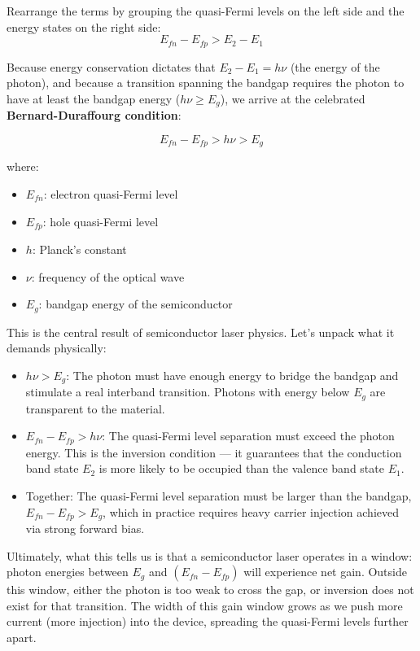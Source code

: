 Rearrange the terms by grouping the quasi-Fermi levels on the left side and the energy states on the right side:
\begin{equation*}
    E_{fn} - E_{fp} > E_2 - E_1
\end{equation*}

Because energy conservation dictates that $E_2 - E_1 = h\nu$ (the energy of the photon), and because a transition spanning the bandgap requires the photon to have at least the bandgap energy ($h\nu \geq E_g$), we arrive at the celebrated \textbf{Bernard-Duraffourg condition}:
\begin{keyresult}
    \begin{equation}
        E_{fn} - E_{fp} > h\nu > E_g
    \end{equation}
\end{keyresult}
where:
\begin{itemize}
    \item $E_{fn}$: electron quasi-Fermi level
    \item $E_{fp}$: hole quasi-Fermi level
    \item $h$: Planck's constant
    \item $\nu$: frequency of the optical wave
    \item $E_g$: bandgap energy of the semiconductor
\end{itemize}

This is the central result of semiconductor laser physics. Let's unpack what it demands physically:

\begin{itemize}
    \item $h\nu > E_g$: The photon must have enough energy to bridge the bandgap and stimulate a real interband transition. Photons with energy below $E_g$ are transparent to the material.
    \item $E_{fn} - E_{fp} > h\nu$: The quasi-Fermi level separation must exceed the photon energy. This is the inversion condition — it guarantees that the conduction band state $E_2$ is more likely to be occupied than the valence band state $E_1$.
    \item Together: The quasi-Fermi level separation must be larger than the bandgap, $E_{fn} - E_{fp} > E_g$, which in practice requires heavy carrier injection achieved via strong forward bias.
\end{itemize}

Ultimately, what this tells us is that a semiconductor laser operates in a window: photon energies between $E_g$ and $(E_{fn} - E_{fp})$ will experience net gain. Outside this window, either the photon is too weak to cross the gap, or inversion does not exist for that transition. The width of this gain window grows as we push more current (more injection) into the device, spreading the quasi-Fermi levels further apart.

